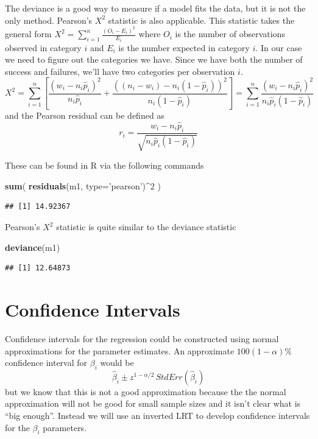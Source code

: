 \documentclass[]{book}
\newenvironment{Shaded}{\begin{snugshade}}{\end{snugshade}}
\newcommand{\KeywordTok}[1]{\textcolor[rgb]{0.13,0.29,0.53}{\textbf{{#1}}}}
\newcommand{\DataTypeTok}[1]{\textcolor[rgb]{0.13,0.29,0.53}{{#1}}}
\newcommand{\DecValTok}[1]{\textcolor[rgb]{0.00,0.00,0.81}{{#1}}}
\newcommand{\StringTok}[1]{\textcolor[rgb]{0.31,0.60,0.02}{{#1}}}
\newcommand{\NormalTok}[1]{{#1}}
\theoremstyle{definition}
\theoremstyle{definition}
\theoremstyle{remark}
\begin{document}
The deviance is a good way to measure if a model fits the data, but it
is not the only method. Pearson's \(X^{2}\) statistic is also
applicable. This statistic takes the general form
\(X^{2}=\sum_{i=1}^{n}\frac{\left(O_{i}-E_{i}\right)^{2}}{E_{i}}\) where
\(O_{i}\) is the number of observations observed in category \(i\) and
\(E_{i}\) is the number expected in category \(i\). In our case we need
to figure out the categories we have. Since we have both the number of
success and failures, we'll have two categories per observation \(i\).
\[X^{2} =   \sum_{i=1}^{n}\left[\frac{\left(w_{i}-n_{i}\hat{p}_{i}\right)^{2}}{n_{i}\hat{p}_{i}}+\frac{\left(\left(n_{i}-w_{i}\right)-n_{i}\left(1-\hat{p}_{i}\right)\right)^{2}}{n_{i}\left(1-\hat{p}_{i}\right)}\right]
    =   \sum_{i=1}^{n}\frac{\left(w_{i}-n_{i}\hat{p}_{i}\right)^{2}}{n_{i}\hat{p}_{i}\left(1-\hat{p}_{i}\right)}\]
and the Pearson residual can be defined as
\[r_{i}=\frac{w_{i}-n_{i}\hat{p}_{i}}{\sqrt{n_{i}\hat{p}_{i}\left(1-\hat{p}_{i}\right)}}\]

These can be found in R via the following commands

\begin{Shaded}
\begin{Highlighting}[]
\KeywordTok{sum}\NormalTok{( }\KeywordTok{residuals}\NormalTok{(m1, }\DataTypeTok{type=}\StringTok{'pearson'}\NormalTok{)^}\DecValTok{2} \NormalTok{)}
\end{Highlighting}
\end{Shaded}

\begin{verbatim}
## [1] 14.92367
\end{verbatim}

Pearson's \(X^{2}\) statistic is quite similar to the deviance statistic

\begin{Shaded}
\begin{Highlighting}[]
\KeywordTok{deviance}\NormalTok{(m1)}
\end{Highlighting}
\end{Shaded}

\begin{verbatim}
## [1] 12.64873
\end{verbatim}

\section{Confidence Intervals}\label{confidence-intervals}

Confidence intervals for the regression could be constructed using
normal approximations for the parameter estimates. An approximate
\(100\left(1-\alpha\right)\%\) confidence interval for \(\beta_{i}\)
would be
\[\hat{\beta}_{i}\pm z^{1-\alpha/2}\,StdErr\left(\hat{\beta}_{i}\right)\]
but we know that this is not a good approximation because the the normal
approximation will not be good for small sample sizes and it isn't clear
what is ``big enough''. Instead we will use an inverted LRT to develop
confidence intervals for the \(\beta_{i}\) parameters.
\end{document}
